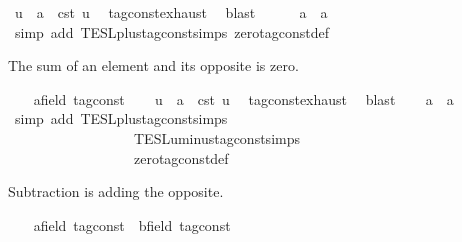 \begin{isabellebody}
\ u\ \ {\isacartoucheopen}a\ {\isacharequal}\ {\isasymtau}\isactrlsub c\isactrlsub s\isactrlsub t\ u{\isacartoucheclose}\ \isamarkupfalse%
\ tag{\isacharunderscore}const{\isachardot}exhaust\ \isamarkupfalse%
\ blast\isanewline
\ \ \isamarkupfalse%
\ {\isacartoucheopen}{}\ {\isacharplus}\ a\ {\isacharequal}\ a{\isacartoucheclose}\isanewline
\ \ \ \ \isamarkupfalse%
\ {\isacharparenleft}simp\ add{\isacharcolon}\ TESL{\isachardot}plus{\isacharunderscore}tag{\isacharunderscore}const{\isachardot}simps\ zero{\isacharunderscore}tag{\isacharunderscore}const{\isacharunderscore}def{\isacharparenright}\isanewline
{}\isamarkupfalse%
%
\begin{isamarkuptext}%
The sum of an element and its opposite is zero.%
\end{isamarkuptext}\isamarkuptrue%
\ \ \isamarkupfalse%
\ a{\isacharcolon}{\isacharcolon}{\isacartoucheopen}{\isacharprime}{\isasymtau}{\isacharcolon}{\isacharcolon}field\ tag{\isacharunderscore}const{\isacartoucheclose}\isanewline
\ \ \isamarkupfalse%
\ u\ \ {\isacartoucheopen}a\ {\isacharequal}\ {\isasymtau}\isactrlsub c\isactrlsub s\isactrlsub t\ u{\isacartoucheclose}\ \isamarkupfalse%
\ tag{\isacharunderscore}const{\isachardot}exhaust\ \isamarkupfalse%
\ blast\isanewline
\ \ \isamarkupfalse%
\ {\isacartoucheopen}{\isacharminus}a\ {\isacharplus}\ a\ {\isacharequal}\ {}{\isacartoucheclose}\isanewline
\ \ \ \ \isamarkupfalse%
\ {\isacharparenleft}simp\ add{\isacharcolon}\ TESL{\isachardot}plus{\isacharunderscore}tag{\isacharunderscore}const{\isachardot}simps\isanewline
\ \ \ \ \ \ \ \ \ \ \ \ \ \ \ \ \ \ TESL{\isachardot}uminus{\isacharunderscore}tag{\isacharunderscore}const{\isachardot}simps\isanewline
\ \ \ \ \ \ \ \ \ \ \ \ \ \ \ \ \ \ zero{\isacharunderscore}tag{\isacharunderscore}const{\isacharunderscore}def{\isacharparenright}\isanewline
{}\isamarkupfalse%
%
\begin{isamarkuptext}%
Subtraction is adding the opposite.%
\end{isamarkuptext}\isamarkuptrue%
\ \ \isamarkupfalse%
\ a{\isacharcolon}{\isacharcolon}{\isacartoucheopen}{\isacharprime}{\isasymtau}{\isacharcolon}{\isacharcolon}field\ tag{\isacharunderscore}const{\isacartoucheclose}\ \ b{\isacharcolon}{\isacharcolon}{\isacartoucheopen}{\isacharprime}{\isasymtau}{\isacharcolon}{\isacharcolon}field\ tag{\isacharunderscore}const{\isacartoucheclose}\isanewline

\end{isabellebody}
